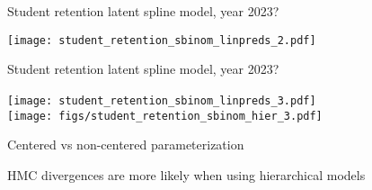 \documentclass[finnish,english,t]{beamer}
\begin{document}
\begin{frame}{Student retention latent spline model, year 2023?}

  \vspace{-0.5\baselineskip}
  \hspace{-8mm}\texttt{[image: student\_retention\_sbinom\_linpreds\_2.pdf]}

\end{frame}

\begin{frame}{Student retention latent spline model, year 2023?}

  \vspace{-0.5\baselineskip}
  \hspace{-8mm}\texttt{[image: student\_retention\_sbinom\_linpreds\_3.pdf]}
  {\\\hspace{-5mm}\texttt{[image: figs/student\_retention\_sbinom\_hier\_3.pdf]}}

\end{frame}




\begin{frame}[fragile]{Centered vs non-centered parameterization}

\vspace{-0.5\baselineskip}
HMC divergences are more likely when using hierarchical models

\end{frame}
\end{document}
